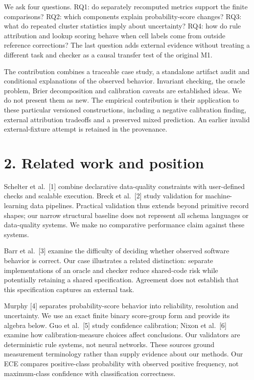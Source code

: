 We ask four questions. RQ1: do separately recomputed metrics support the
finite comparisons? RQ2: which components explain probability-score
changes? RQ3: what do repeated cluster statistics imply about
uncertainty? RQ4: how do rule attribution and lookup scoring behave when
cell labels come from outside reference corrections? The last question
adds external evidence without treating a different task and checker as
a causal transfer test of the original M1.

The contribution combines a traceable case study, a standalone artifact
audit and conditional explanations of the observed behavior. Invariant
checking, the oracle problem, Brier decomposition and calibration
caveats are established ideas. We do not present them as new. The
empirical contribution is their application to these particular
versioned constructions, including a negative calibration finding,
external attribution tradeoffs and a preserved mixed prediction. An
earlier invalid external-fixture attempt is retained in the provenance.

\hypertarget{related-work-and-position}{%
\section{2. Related work and position}\label{related-work-and-position}}

Schelter et al.~{[}1{]} combine declarative data-quality constraints
with user-defined checks and scalable execution. Breck et al.~{[}2{]}
study validation for machine-learning data pipelines. Practical
validation thus extends beyond primitive record shapes; our narrow
structural baseline does not represent all schema languages or
data-quality systems. We make no comparative performance claim against
these systems.

Barr et al.~{[}3{]} examine the difficulty of deciding whether observed
software behavior is correct. Our case illustrates a related
distinction: separate implementations of an oracle and checker reduce
shared-code risk while potentially retaining a shared specification.
Agreement does not establish that this specification captures an
external task.

Murphy {[}4{]} separates probability-score behavior into reliability,
resolution and uncertainty. We use an exact finite binary score-group
form and provide its algebra below. Guo et al.~{[}5{]} study confidence
calibration; Nixon et al.~{[}6{]} examine how calibration-measure
choices affect conclusions. Our validators are deterministic rule
systems, not neural networks. These sources ground measurement
terminology rather than supply evidence about our methods. Our ECE
compares positive-class probability with observed positive frequency,
not maximum-class confidence with classification correctness.

